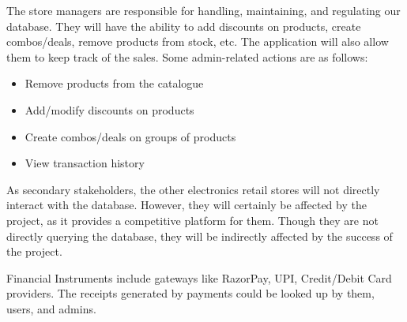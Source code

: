 \begin{stakeholder}
The store managers are responsible for handling, maintaining, and regulating our database.
They will have the ability to add discounts on products, create combos/deals, remove products from stock, etc.
The application will also allow them to keep track of the sales. Some admin-related actions are as follows:
\vspace*{-2pt}
\begin{itemize}
    \setlength\itemsep{0.05mm}
    \item Remove products from the catalogue
    \item Add/modify discounts on products
    \item Create combos/deals on groups of products
    \item View transaction history
\end{itemize}
\end{stakeholder}

\begin{stakeholder}
As secondary stakeholders, the other electronics retail stores will not directly interact with the database.
However, they will certainly be affected by the project, as it provides a competitive platform for them.
Though they are not directly querying the database, they will be indirectly affected by the success of the project.
\end{stakeholder}
\vspace*{2pt}

\begin{stakeholder}
Financial Instruments include gateways like RazorPay, UPI, Credit/Debit Card providers.
The receipts generated by payments could be looked up by them, users, and admins.
\end{stakeholder}
\vspace*{2pt}